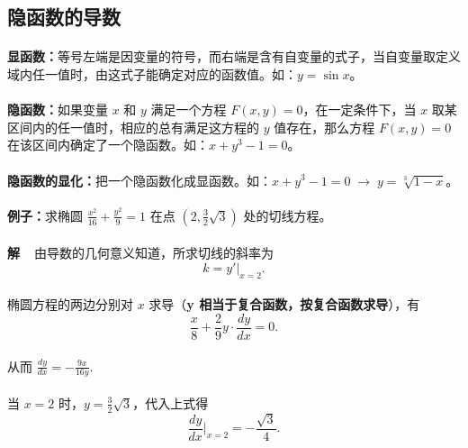 \subsection{隐函数的导数}
\paragraph{}
\textbf{显函数：}等号左端是因变量的符号，而右端是含有自变量的式子，当自变量取定义域内任一值时，由这式子能确定对应的函数值。如：$y = \sin x$。

\paragraph{}
\textbf{隐函数：}如果变量 $x$ 和 $y$ 满足一个方程 $F(x,y) = 0$，在一定条件下，当 $x$ 取某区间内的任一值时，相应的总有满足这方程的 $y$ 值存在，那么方程 $F(x,y) = 0$ 在该区间内确定了一个隐函数。如：$x + y^3 - 1 = 0$。

\paragraph{}
\textbf{隐函数的显化：}把一个隐函数化成显函数。如：$x + y^3 - 1 = 0 \; \to \; y = \sqrt[3]{1 - x}$。

\paragraph{}
\textbf{例子：}求椭圆 $\frac{x^2}{16} + \frac{y^2}{9} = 1$ 在点 $(2, \frac{3}{2}\sqrt{3})$ 处的切线方程。
\paragraph{}
\textbf{解~~}由导数的几何意义知道，所求切线的斜率为
\begin{equation*}
k = y'|_{x = 2}.
\end{equation*}
\paragraph{}
椭圆方程的两边分别对 $x$ 求导（\textbf{y 相当于复合函数，按复合函数求导}），有
\begin{equation*}
\frac{x}{8} + \frac{2}{9}y \cdot \frac{dy}{dx} = 0.
\end{equation*}
\paragraph{}
从而 $\frac{dy}{dx} = -\frac{9x}{16y}.$
\paragraph{}
当 $x = 2$ 时，$y = \frac{3}{2}\sqrt{3}$，代入上式得
\begin{equation*}
\frac{dy}{dx}|_{x = 2} = -\frac{\sqrt{3}}{4}.
\end{equation*}
